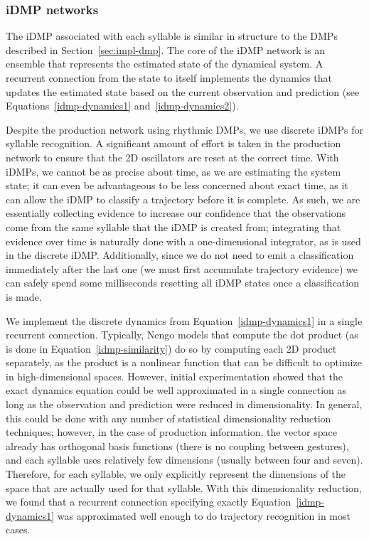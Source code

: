 \subsubsection{iDMP networks}

The iDMP associated with each syllable
is similar in structure to the DMPs
described in Section~\ref{sec:impl-dmp}.
The core of the iDMP network
is an ensemble that represents
the estimated state of the dynamical system.
A recurrent connection
from the state to itself
implements the dynamics
that updates the estimated state
based on the current observation
and prediction
(see Equations~\eqref{idmp-dynamics1}
and~\eqref{idmp-dynamics2}).

Despite the production network using rhythmic DMPs,
we use discrete iDMPs for syllable recognition.
A significant amount of effort is taken
in the production network to ensure that
the 2D oscillators are reset at the correct time.
With iDMPs, we cannot be as precise about time,
as we are estimating the system state;
it can even be advantageous
to be less concerned about exact time,
as it can allow the iDMP to classify a trajectory
before it is complete.
As such, we are essentially collecting evidence
to increase our confidence that the
observations come from the same syllable
that the iDMP is created from;
integrating that evidence over time
is naturally done with a one-dimensional integrator,
as is used in the discrete iDMP.
Additionally, since we do not need to emit
a classification immediately after
the last one (we must first accumulate
trajectory evidence)
we can safely spend some milliseconds
resetting all iDMP states
once a classification is made.

We implement the discrete dynamics
from Equation~\eqref{idmp-dynamics1}
in a single recurrent connection.
Typically,
Nengo models that compute the dot product
(as is done in Equation~\eqref{idmp-similarity})
do so by computing each 2D product separately,
as the product is a nonlinear function
that can be difficult to optimize
in high-dimensional spaces.
However, initial experimentation
showed that the exact dynamics equation
could be well approximated
in a single connection
as long as the observation
and prediction were reduced in dimensionality.
In general, this could be done
with any number of statistical dimensionality
reduction techniques;
however, in the case of production information,
the vector space already has
orthogonal basis functions
(there is no coupling between gestures),
and each syllable uses
relatively few dimensions
(usually between four and seven).
Therefore, for each syllable,
we only explicitly represent
the dimensions of the space
that are actually used for that syllable.
With this dimensionality reduction,
we found that a recurrent connection
specifying exactly Equation~\eqref{idmp-dynamics1}
was approximated well enough
to do trajectory recognition in most cases.

